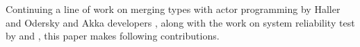 \begin{comment}
Implementing 
type-parameterized actors in a statically-typed language; however, requires 
solving following three problems.

\begin{enumerate}
  \item A typed name server is required to retrieve actor references of
specific types.  A distributed system usually requires a name server that
maps names of services to processes that implement that service.  If processes
are dynamically typed, this is usually implemented as a map from names to 
processes. Can this be adapted to cases where processes are statically 
typed?

  \item Supervisor actors must interact with child actors of different types.  
Actors are structured in supervision trees to improve system reliability.  Each 
actor in a supervision tree needs to handle messages within its specific 
interests and also messages from its supervisor.  Is it practical to define a 
supervisor that communicates with children of different type parameters?

  \item Actors which receive messages from distinct parties may suffer from 
the type pollution problem, in which case a party imports too much type  
information about an actor and can send the actor messages not expected from it.
Systems built on layered architecture or the MVC model are often victims of the 
type pollution problem. As an actor receives messages from distinct parties 
using its sole channel, its type parameter is the union type of all expected 
message types.  Therefore, unexpected messages can be sent to actors which 
naively publishes its type parameter or permits dynamically typed messages. 
Can a type-parameterised actor have different types of communication interface, 
i.e. typed actor reference, when published to parties.
\end{enumerate}


\end{comment}

Continuing a line of work on merging types with actor programming by Haller
and Odersky \citep{actor_1, actor_2} and Akka developers \citep{akka_doc}, 
along with the work on system reliability test by 
\citet{ChaosMonkey} and \citet{ErlangChaosMonkey}, this paper makes 
following contributions.

